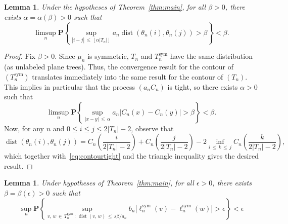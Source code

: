 \documentclass[10pt]{amsart}
\newtheorem{lemm}[theo]{Lemma}\newtheorem{prop}[theo]{Proposition}\newtheorem{coro}[theo]{Corollary}\newtheorem{conj}[theo]{Conjecture}
\theoremstyle{definition}\newtheorem{defi}[theo]{Definition}\newtheorem{rema}[theo]{Remark}\newtheorem{exam}[theo]{Example}\newtheorem{exem}[theo]{Example}\newtheorem{nota}[theo]{Notation}
\DeclareMathOperator{\sym}{sym}
\DeclareMathOperator{\dist}{dist}
\newcommand{\p}[1]{\mathbf{P}\left\{#1\right\}}
\begin{document}
\begin{lemm}\label{lem:contourTight}
Under the hypotheses of Theorem~\ref{thm:main}, for all $\beta>0$, there exists $\alpha = \alpha(\beta)>0$ such that
\[
\limsup_n\p{\sup_{|i-j|\,\le\,\left\lfloor \alpha |T_n| \right\rfloor} a_n \dist\left(\theta_{n}(i),\theta_{n}(j)\right)> \beta}<\beta.
\]
\end{lemm}


\begin{proof}
Fix $\beta>0$. Since $\mu_n$ is symmetric, $T_n$ and $T^{\sym}_n$ have the same distribution (as unlabeled plane trees). Thus, the convergence result for the contour of $(T^{\sym}_n)$ translates immediately into the same result for the contour of $(T_n)$. This implies in particular that the process $(a_nC_n)$ is tight, so there exists $\alpha>0$ such that
\begin{equation}\label{eq:contourtight}
\limsup_n\p{\sup_{|x-y|\,\le\,\alpha} a_n \left|C_n(x)-C_n(y)\right|> \beta}<\beta.
\end{equation}
Now, for any $n$ and $0\le i\le j \le 2|T_n|-2$, observe that
\[
\dist\left(\theta_n(i),\theta_n(j)\right) = C_n\left(\frac{i}{2|T_n|-2}\right)+C_n\left(\frac{j}{2|T_n|-2}\right)-2 \inf_{i\,\le\,k\,\le\,j}C_n\left(\frac{k}{2|T_n|-2}\right),
\]
which together with~\eqref{eq:contourtight} and the triangle inequality gives the desired result.
\end{proof}


\begin{lemm}\label{lem:labelTight}
Under hypotheses of Theorem~\ref{thm:main}, for all $\epsilon>0$, there exists $\beta=\beta(\epsilon)>0$ such that
\[
\sup_n\p{\sup_{v,\,w\,\in\,T_n^{\sym}\,:\,\dist(v,\,w)\,\le\,s \beta/a_n} b_n \left|\ell^{\sym}_n(v) -\ell^{\sym}_n(w)\right|>\epsilon}<\epsilon
\]
\end{lemm}
\end{document}
